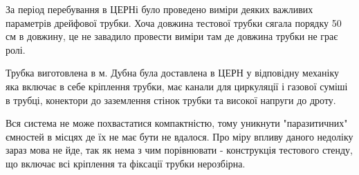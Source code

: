 \documentclass[pdftex,14pt]{scrartcl}
\begin{document}

	 	
	За період перебування в ЦЕРНі було проведено виміри деяких важливих параметрів дрейфової трубки.	Хоча довжина тестової трубки сягала порядку 50 см в довжину, це не завадило провести виміри там де довжина трубки не грає ролі.
	
	Трубка виготовлена в м. Дубна була доставлена в ЦЕРН у відповідну механіку яка включає в себе кріплення трубки, має канали для циркуляції і газової суміші в трубці, конектори до заземлення стінок трубки та високої напруги до дроту.
	
	Вся система не може похвастатися компактністю, тому уникнути "паразитичних" ємностей в місцях де їх не має бути не вдалося. Про міру впливу даного недоліку зараз мова не йде, так як нема з чим порівнювати - конструкція тестового стенду, що включає всі кріплення та фіксації трубки нерозбірна.
	
	
\end{document}
